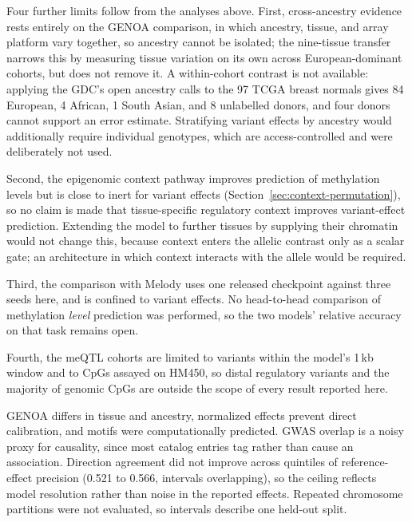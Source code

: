 \documentclass[10pt,letterpaper,twocolumn]{article}
\begin{document}
{\color{addedred}
Four further limits follow from the analyses above. First, cross-ancestry
evidence rests entirely on the GENOA comparison, in which ancestry, tissue, and
array platform vary together, so ancestry cannot be isolated; the nine-tissue
transfer narrows this by measuring tissue variation on its own across
European-dominant cohorts, but does not remove it. A within-cohort contrast is
not available: applying the GDC's open ancestry calls to the 97 TCGA breast
normals gives 84 European, 4 African, 1 South Asian, and 8 unlabelled donors,
and four donors cannot support an error estimate. Stratifying variant effects by
ancestry would additionally require individual genotypes, which are
access-controlled and were deliberately not used.

Second, the epigenomic context pathway improves prediction of methylation
levels but is close to inert for variant effects
(Section~\ref{sec:context-permutation}), so no claim is made that tissue-specific
regulatory context improves variant-effect prediction. Extending the model to
further tissues by supplying their chromatin would not change this, because
context enters the allelic contrast only as a scalar gate; an architecture in
which context interacts with the allele would be required.

Third, the comparison with Melody uses one released checkpoint against three
seeds here, and is confined to variant effects. No head-to-head comparison of
methylation \emph{level} prediction was performed, so the two models' relative
accuracy on that task remains open.

Fourth, the meQTL cohorts are limited to variants within the model's 1\,kb
window and to CpGs assayed on HM450, so distal regulatory variants and the
majority of genomic CpGs are outside the scope of every result reported here.
}

{\color{addedred}
GENOA differs in tissue and ancestry, normalized effects prevent direct
calibration, and motifs were computationally predicted. GWAS overlap is a noisy proxy for causality, since most catalog entries tag rather than cause an association. Direction agreement did not improve across quintiles of reference-effect
precision (0.521 to 0.566, intervals overlapping), so the ceiling reflects model
resolution rather than noise in the reported effects. Repeated chromosome partitions were not evaluated, so
intervals describe one held-out split.
}
\end{document}
